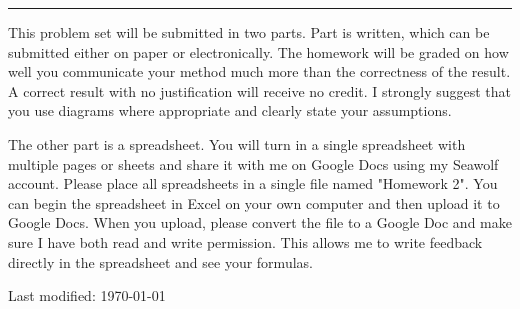 \documentclass{article}
\begin{document}
\hrule
\vspace{10pt}


This problem set will be submitted in two parts.  Part is written, which
can be submitted either on paper or electronically.  The homework will
be graded on how well you communicate your method much more than the
correctness of the result.  A correct result with no justification will
receive no credit.  I strongly suggest that you use diagrams where
appropriate and clearly state your assumptions.

The other part is a spreadsheet.  You will turn in a single spreadsheet
with multiple pages or sheets and share it with me on Google Docs using
my Seawolf account.  Please place all spreadsheets in a single file
named "Homework 2".  You can begin the spreadsheet in Excel on your own
computer and then upload it to Google Docs.  When you upload, please
convert the file to a Google Doc and make sure I have both read and
write permission.  This allows me to write feedback directly in the
spreadsheet and see your formulas.

{\tiny Last modified: \today}



\end{document}
